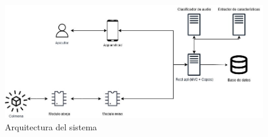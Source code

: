 \begin{figure}[!ht]
    \centering
    \includegraphics[width=\textwidth]{assets/cap_3/arquitectura_sistema.jpg}
    \caption{Arquitectura del sistema}
    \label{fig:arquitectura_sistema}
\end{figure}